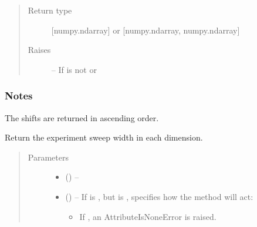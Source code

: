 \documentclass[letterpaper,10pt,english]{sphinxmanual}
\begin{document}
\begin{fulllineitems}
\begin{fulllineitems}
\begin{quote}
\begin{description}
\item[{Return type}] \leavevmode
\sphinxAtStartPar
{[}numpy.ndarray{]} or {[}numpy.ndarray, numpy.ndarray{]}

\item[{Raises}] \leavevmode
\sphinxAtStartPar
{\hyperref[\detokenize{references/errors:nmrespy._errors.InvalidUnitError}]{}} – If  is not  or 

\end{description}\end{quote}
\subsubsection*{Notes}

\sphinxAtStartPar
The shifts are returned in ascending order.

\end{fulllineitems}


\begin{fulllineitems}
\label{\detokenize{references/core:nmrespy.core.Estimator.get_sw}}
\sphinxAtStartPar
Return the experiment sweep width in each dimension.
\begin{quote}\begin{description}
\item[{Parameters}] \leavevmode\begin{itemize}
\item {} 
\sphinxAtStartPar
{} (\sphinxstyleliteralemphasis{\sphinxupquote{, }}) – 

\item {} 
\sphinxAtStartPar
{} (\sphinxstyleliteralemphasis{\sphinxupquote{, }}) – 
\sphinxAtStartPar
If  is , but  is ,  specifies
how the method will act:
\begin{itemize}
\item {} 
\sphinxAtStartPar
If , an AttributeIsNoneError is raised.


\end{itemize}
\end{itemize}
\end{description}
\end{quote}
\end{fulllineitems}
\end{fulllineitems}
\end{document}
